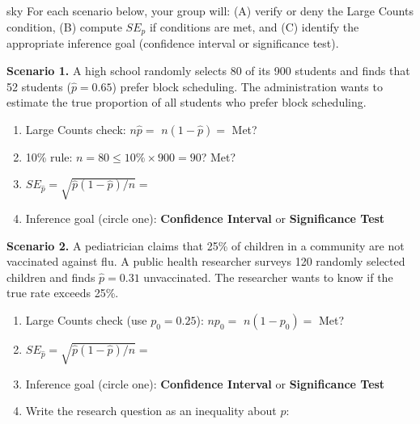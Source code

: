 \documentclass[10pt]{article}
\begin{document}
\namepartnerperiod

\vspace{0.15in}

\begin{scenariobox}{sky}
For each scenario below, your group will: (A) verify or deny the Large Counts condition,
(B) compute $SE_{\hat p}$ if conditions are met, and (C) identify the appropriate inference
goal (confidence interval or significance test).
\end{scenariobox}

\vspace{0.1in}

\textbf{Scenario 1.} A high school randomly selects 80 of its 900 students and finds that
52 students ($\hat p = 0.65$) prefer block scheduling. The administration wants to estimate
the true proportion of all students who prefer block scheduling.

\begin{enumerate}[label=\alph*.]
  \item Large Counts check: $n\hat p = $ \blank{2.5cm} \quad $n(1-\hat p) = $ \blank{2.5cm} \quad Met? \blank{1.5cm}
  \item 10\% rule: $n = 80 \le 10\% \times 900 = 90$? \hfill Met? \blank{1.5cm}
  \item $SE_{\hat p} = \sqrt{\hat p(1-\hat p)/n} = $ \blank{6cm}
  \item Inference goal (circle one): \quad \textbf{Confidence Interval} \quad or \quad \textbf{Significance Test}
\end{enumerate}

\vspace{0.15in}

\textbf{Scenario 2.} A pediatrician claims that 25\% of children in a community are not
vaccinated against flu. A public health researcher surveys 120 randomly selected children
and finds $\hat p = 0.31$ unvaccinated. The researcher wants to know if the true rate
exceeds 25\%.

\begin{enumerate}[label=\alph*.]
  \item Large Counts check (use $p_0 = 0.25$): $np_0 = $ \blank{2.5cm} \quad $n(1-p_0) = $ \blank{2.5cm} \quad Met? \blank{1.5cm}
  \item $SE_{\hat p} = \sqrt{\hat p(1-\hat p)/n} = $ \blank{6cm}
  \item Inference goal (circle one): \quad \textbf{Confidence Interval} \quad or \quad \textbf{Significance Test}
  \item Write the research question as an inequality about $p$: \writeline
\end{enumerate}
\end{document}
